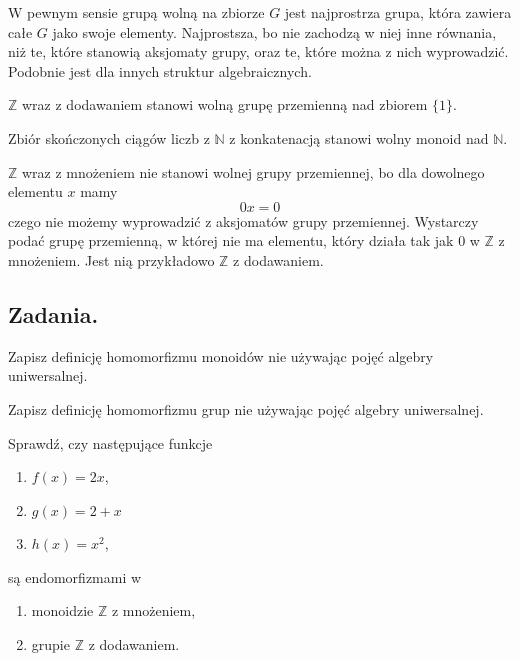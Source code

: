 W pewnym sensie grupą wolną na zbiorze $G$ jest najprostrza grupa,
	która zawiera całe $G$ jako swoje elementy.
Najprostsza,
	bo nie zachodzą w niej inne równania,
	niż te,
	które stanowią aksjomaty grupy,
	oraz te,
	które można z nich wyprowadzić.
Podobnie jest dla innych struktur algebraicznych.

\begin{example}
	$\mathbb{Z}$ wraz z dodawaniem stanowi wolną grupę przemienną nad zbiorem $\{1\}$.
\end{example}

\begin{example}
	Zbiór skończonych ciągów liczb z $\mathbb{N}$ z konkatenacją stanowi wolny monoid nad $\mathbb{N}$.
\end{example}

\begin{example}
	$\mathbb{Z}$ wraz z mnożeniem nie stanowi wolnej grupy przemiennej,
		bo dla dowolnego elementu $x$ mamy
		\begin{equation}
		0x = 0
		\end{equation}
		czego nie możemy wyprowadzić z aksjomatów grupy przemiennej.
	Wystarczy podać grupę przemienną,
		w której nie ma elementu,
		który działa tak jak $0$ w $\mathbb{Z}$ z mnożeniem.
	Jest nią przykładowo $\mathbb{Z}$ z dodawaniem.
\end{example}

\subsection{Zadania.}

\begin{exercise}
	Zapisz definicję homomorfizmu monoidów nie używając pojęć algebry uniwersalnej.
\end{exercise}

\begin{exercise}
	Zapisz definicję homomorfizmu grup nie używając pojęć algebry uniwersalnej.
\end{exercise}

\begin{exercise}
	Sprawdź, czy następujące funkcje
	\begin{enumerate}
		\item $f(x) = 2x$,
		\item $g(x) = 2 + x$
		\item $h(x) = x^2$,
	\end{enumerate}
	są endomorfizmami w
	\begin{enumerate}
		\item monoidzie $\mathbb{Z}$ z mnożeniem,
		\item grupie $\mathbb{Z}$ z dodawaniem.
	\end{enumerate}
\end{exercise}

